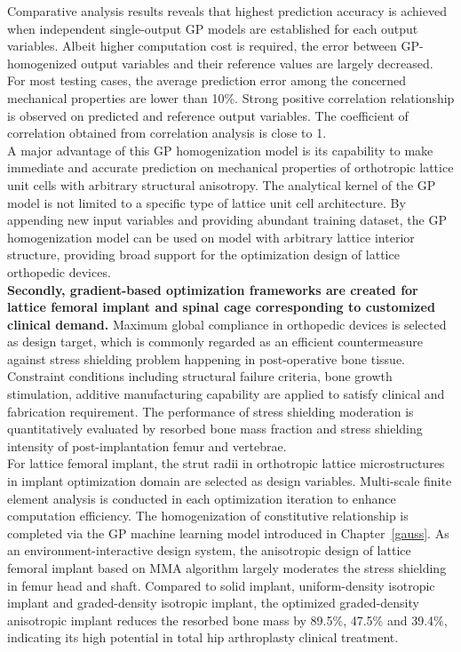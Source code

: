 \documentclass[12pt]{extbook}
\begin{document}
Comparative analysis results reveals that highest prediction accuracy is achieved when independent single-output GP models are established for each output variables. Albeit higher computation cost is required, the error between GP-homogenized output variables and their reference values are largely decreased. For most testing cases, the average prediction error among the concerned mechanical properties are lower than 10\%. Strong positive correlation relationship is observed on predicted and reference output variables. The coefficient of correlation obtained from correlation analysis is close to 1.\\ 

A major advantage of this GP homogenization model is its capability to make immediate and accurate prediction on mechanical properties of orthotropic lattice unit cells with arbitrary structural anisotropy. The analytical kernel of the GP model is not limited to a specific type of lattice unit cell architecture. By appending new input variables and providing abundant training dataset, the GP homogenization model can be used on model with arbitrary lattice interior structure, providing broad support for the optimization design of lattice orthopedic devices.\\

{\bf Secondly, gradient-based optimization frameworks are created for lattice femoral implant and spinal cage corresponding to customized clinical demand.} Maximum global compliance in orthopedic devices is selected as design target, which is commonly regarded as an efficient countermeasure against stress shielding problem happening in post-operative bone tissue. Constraint conditions including structural failure criteria, bone growth stimulation, additive manufacturing capability are applied to satisfy clinical and fabrication requirement. The performance of stress shielding moderation is quantitatively evaluated by resorbed bone mass fraction and stress shielding intensity of post-implantation femur and vertebrae.\\

For lattice femoral implant, the strut radii in orthotropic lattice microstructures in implant optimization domain are selected as design variables. Multi-scale finite element analysis is conducted in each optimization iteration to enhance computation efficiency. The homogenization of constitutive relationship is completed via the GP machine learning model introduced in Chapter~\ref{gauss}. As an environment-interactive design system, the anisotropic design of lattice femoral implant based on MMA algorithm largely moderates the stress shielding in femur head and shaft. Compared to solid implant, uniform-density isotropic implant and graded-density isotropic implant, the optimized graded-density anisotropic implant reduces the resorbed bone mass by 89.5\%, 47.5\% and 39.4\%, indicating its high potential in total hip arthroplasty clinical treatment.\\
\end{document}
